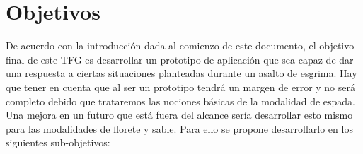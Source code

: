 \documentclass[11pt,a4paper,twoside,final]{article}
\begin{document}



\newpage

\section{Objetivos}





De acuerdo con la introducción dada al comienzo de este documento, el objetivo final de este TFG es desarrollar un prototipo de aplicación que sea capaz de dar una respuesta a ciertas situaciones planteadas durante un asalto de esgrima. Hay que tener en cuenta que al ser un prototipo tendrá un margen de error y no será completo debido que trataremos las nociones básicas de la modalidad de espada. Una mejora en un futuro que está fuera del alcance sería desarrollar esto mismo para las modalidades de florete y sable. Para ello se propone desarrollarlo en los siguientes sub-objetivos:
\end{document}
